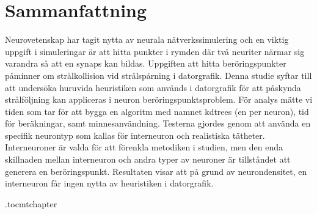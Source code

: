 \newpage
\thispagestyle{plain}
\chapter*{Sammanfattning}
Neurovetenskap har tagit nytta av neurala nätverkssimulering och en viktig uppgift i simuleringar är att hitta punkter i rymden där två neuriter närmar sig varandra så att en synaps kan bildas. Uppgiften att hitta beröringspunkter påminner om strålkollision vid strålspårning i datorgrafik. Denna studie syftar till att undersöka huruvida heuristiken som används i datorgrafik för att påskynda strålföljning kan appliceras i neuron beröringspunktsproblem. För analys mätte vi tiden som tar för att bygga en algoritm med namnet kdtrees (en per neuron), tid för beräkningar, samt minnesanvändning. Testerna gjordes genom att använda en specifik neurontyp som kallas för interneuron och realistiska tätheter. Interneuroner är valda för att förenkla metodiken i studien, men den enda skillnaden mellan interneuron och andra typer av neuroner är tillståndet att generera en beröringspunkt. Resultaten visar att på grund av neurondensitet, en interneuron får ingen nytta av heuristiken i datorgrafik.
\newpage

\etocdepthtag.toc{mtchapter}
\thispagestyle{plain}
\tableofcontents

\newpage



